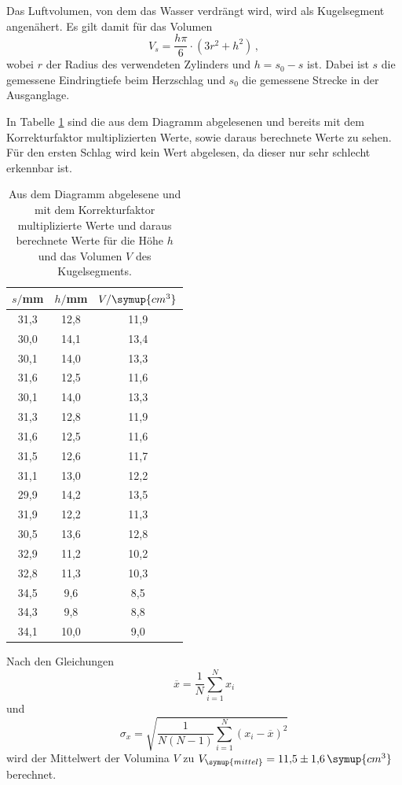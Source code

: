 Das Luftvolumen, von dem das Wasser verdrängt wird, wird als Kugelsegment angenähert.
Es gilt damit für das Volumen
\begin{equation}
  V_s = \frac{h\pi}{6}\cdot(3r^2 + h^2) \,,
\end{equation}
wobei $r$ der Radius des verwendeten Zylinders und $h=s_0-s$ ist. Dabei ist $s$
die gemessene Eindringtiefe beim Herzschlag und $s_0$ die gemessene Strecke in
der Ausganglage.

In Tabelle \ref{tab:herz} sind die aus dem Diagramm abgelesenen und bereits mit dem
Korrekturfaktor multiplizierten Werte, sowie daraus berechnete Werte zu sehen. Für den
ersten Schlag wird kein Wert abgelesen, da dieser nur sehr schlecht erkennbar ist.

\begin{table}[h!]
	\begin{center}
    \caption{Aus dem Diagramm abgelesene und mit dem Korrekturfaktor multiplizierte Werte und
    daraus berechnete Werte für die Höhe $h$ und das Volumen $V$ des Kugelsegments.}
    \label{tab:herz}
		\begin{tabular}{ccc}
		\toprule
			{$s/$mm} & {$h/$mm} & {$V/\symup{cm^3}$}\\
			\midrule
			31,3 & 12,8 & 11,9\\
			30,0 & 14,1 & 13,4\\
			30,1 & 14,0 & 13,3\\
			31,6 & 12,5 & 11,6\\
			30,1 & 14,0 & 13,3\\
			31,3 & 12,8 & 11,9\\
			31,6 & 12,5 & 11,6\\
			31,5 & 12,6 & 11,7\\
			31,1 & 13,0 & 12,2\\
			29,9 & 14,2 & 13,5\\
			31,9 & 12,2 & 11,3\\
			30,5 & 13,6 & 12,8\\
			32,9 & 11,2 & 10,2\\
			32,8 & 11,3 & 10,3\\
			34,5 & 9,6 & 8,5\\
			34,3 & 9,8 & 8,8\\
			34,1 & 10,0 & 9,0\\
		\bottomrule
		\end{tabular}
	\end{center}
\end{table}

Nach den Gleichungen
\begin{equation}
  \overline{x} = \frac{1}{N} \sum\limits_{i = 1}^N x_i
  \label{eqn:mean}
\end{equation}
und
\begin{equation}
  \sigma_x = \sqrt{\frac{1}{N(N-1)}
    \sum\limits_{i = 1}^N
    (x_i-\overline{x})^2}
    \label{eqn:std}
\end{equation}
wird der Mittelwert der Volumina $V$ zu $V_{\symup{mittel}}=11{,}5\pm1{,}6\,\symup{cm^3}$
berechnet.

